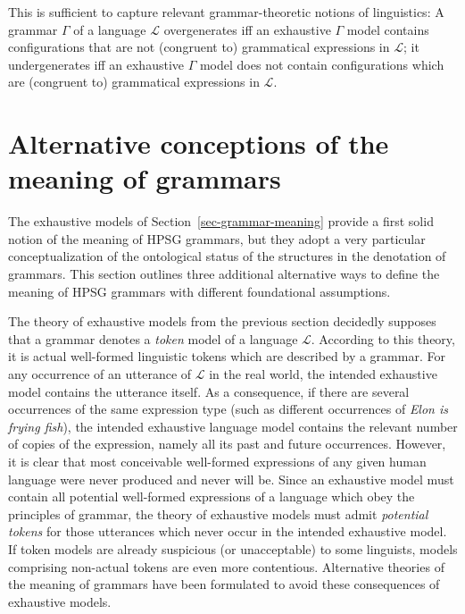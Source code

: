 \documentclass[output=paper
                ,modfonts
                ,nonflat
	        ,collection
	        ,collectionchapter
	        ,collectiontoclongg
 	        ,biblatex
                ,babelshorthands
                ,newtxmath
                ,draftmode
                ,colorlinks, citecolor=brown
]{./langsci/langscibook}
\begin{document}
{{This is sufficient to capture relevant grammar-theoretic notions of
linguistics: A grammar $\Gamma$ of a language $\mathcal{L}$
overgenerates iff an exhaustive $\Gamma$ model contains configurations
that are not (congruent to) grammatical expressions in $\mathcal{L}$;
it undergenerates iff an exhaustive $\Gamma$ model does not contain
configurations which are (congruent to) grammatical expressions in
$\mathcal{L}$.




\section{Alternative conceptions of the meaning of grammars}
\label{sec-alt-gr-meaning}

The exhaustive models of Section~\ref{sec-grammar-meaning} provide a
first solid notion of the meaning of HPSG grammars, but they adopt a
very particular conceptualization of the ontological status of the
structures in the denotation of grammars. This section outlines three
additional alternative ways to define the meaning of HPSG grammars
with different foundational assumptions.


The theory of exhaustive models from the previous section decidedly supposes that a grammar
denotes a \emph{token} model of a language $\mathcal{L}$. According to
this theory, it is actual well-formed linguistic tokens which are
described by a grammar.  For any occurrence of an utterance of
$\mathcal{L}$ in the real world, the intended exhaustive model
contains the utterance itself. As a consequence, if there are several
occurrences of the same expression type (such as different occurrences
of {\em Elon is frying fish}), the intended exhaustive language model
contains the relevant number of copies of the expression, namely all
its past and future occurrences. However, it is clear that
most conceivable well-formed expressions of any given human language
were never produced and never will be. Since an exhaustive model must
contain all potential well-formed expressions of a language which obey
the principles of grammar, the theory of exhaustive models must admit
\emph{potential tokens} for those utterances which never occur in the
intended exhaustive model. If token models are already suspicious (or
unacceptable) to
some linguists, models comprising non-actual tokens are even more contentious.
Alternative theories of the meaning of grammars have been formulated
to avoid these consequences of exhaustive models.

}}
\end{document}
